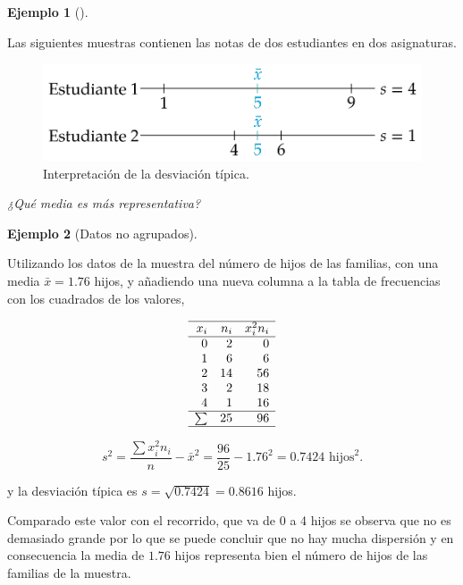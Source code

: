 \documentclass[
  a4paper,
]{scrreport}
\theoremstyle{plain}
\theoremstyle{definition}
\newtheorem{example}{Ejemplo}[chapter]
\theoremstyle{definition}
\theoremstyle{remark}
\begin{document}
\begin{example}[]\protect\hypertarget{exm-intrepretacion-desviacion-tipica}{}\label{exm-intrepretacion-desviacion-tipica}

Las siguientes muestras contienen las notas de dos estudiantes en dos
asignaturas.

\begin{figure}[H]

{\centering \includegraphics{img/descriptiva/interpretacion_desviacion_tipica.png}

}

\caption{Interpretación de la desviación típica.}

\end{figure}%

\emph{¿Qué media es más representativa?}

\end{example}

\begin{example}[Datos no
agrupados]\protect\hypertarget{exm-desviacion-tipica-datos-no-agrupados}{}\label{exm-desviacion-tipica-datos-no-agrupados}

Utilizando los datos de la muestra del número de hijos de las familias,
con una media \(\bar x=1.76\) hijos, y añadiendo una nueva columna a la
tabla de frecuencias con los cuadrados de los valores,

\[
\begin{array}{rrr}
\hline
x_i & n_i & x_i^2n_i \\
\hline
0 & 2 & 0 \\
1 & 6 & 6 \\
2 & 14 & 56\\
3 & 2  & 18\\
4 & 1 & 16 \\
\hline
\sum & 25 & 96 \\
\hline
\end{array}\]

\[s^2 = \frac{\sum x_i^2n_i}{n}-\bar x^2 = \frac{96}{25}-1.76^2= 0.7424 \mbox{ hijos}^2.\]

y la desviación típica es \(s=\sqrt{0.7424} = 0.8616\) hijos.

Comparado este valor con el recorrido, que va de 0 a 4 hijos se observa
que no es demasiado grande por lo que se puede concluir que no hay mucha
dispersión y en consecuencia la media de \(1.76\) hijos representa bien
el número de hijos de las familias de la muestra.

\end{example}
\end{document}
